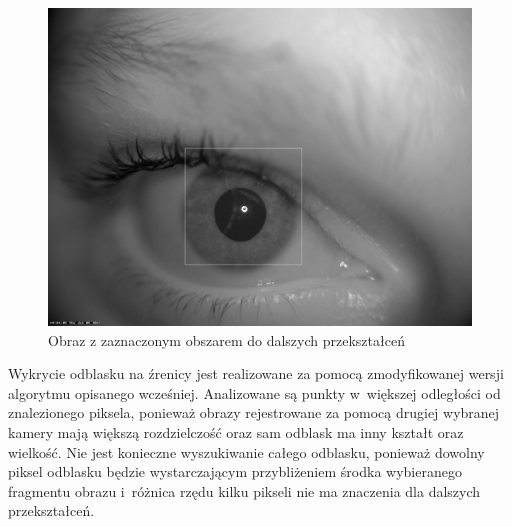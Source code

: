 \begin{figure}[h!]
\begin{center}
\includegraphics[scale=0.25]{obszar.jpg}
\caption{Obraz z zaznaczonym obszarem do dalszych przekształceń}
\label{fig:obszar}
\end{center}
\end{figure}

Wykrycie odblasku na źrenicy jest realizowane za pomocą zmodyfikowanej wersji algorytmu opisanego wcześniej. Analizowane są punkty w~większej odległości od znalezionego piksela, ponieważ obrazy rejestrowane za pomocą drugiej wybranej kamery mają większą rozdzielczość oraz sam odblask ma inny kształt oraz wielkość. Nie jest konieczne wyszukiwanie całego odblasku, ponieważ dowolny piksel odblasku będzie wystarczającym przybliżeniem środka wybieranego fragmentu obrazu i~różnica rzędu kilku pikseli nie ma znaczenia dla dalszych przekształceń.

